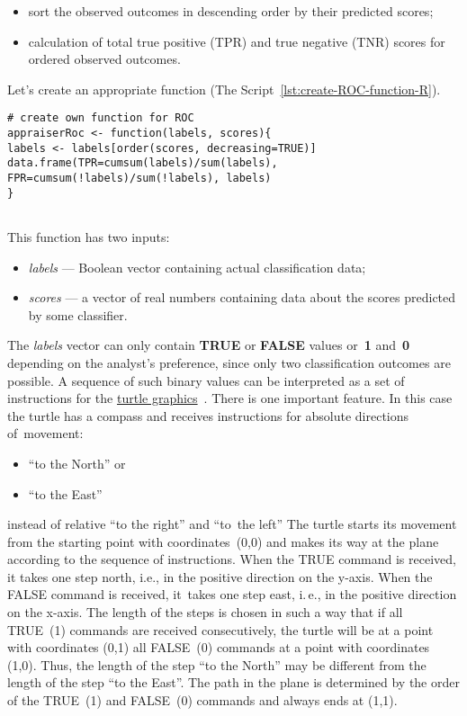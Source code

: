 \documentclass[]{scrreprt}
\begin{document}
\begin{itemize}
	\item sort the observed outcomes in descending order by their predicted scores;
	\item calculation of total true positive (TPR) and true negative (TNR) scores for ordered observed outcomes.
\end{itemize}
Let's create an appropriate function (The Script~\ref{lst:create-ROC-function-R}).
%
\begin{lstlisting}[float=htp, caption = Creating a~function to~calculate TPR and FPR, firstnumber=1, label= lst:create-ROC-function-R]
# create own function for ROC
appraiserRoc <- function(labels, scores){
labels <- labels[order(scores, decreasing=TRUE)]
data.frame(TPR=cumsum(labels)/sum(labels),
FPR=cumsum(!labels)/sum(!labels), labels)
}
 
\end{lstlisting}
%
This function has two inputs:
\begin{itemize}
	\item \emph{labels} --- Boolean vector containing actual classification data;
	\item \emph{scores} --- a vector of real numbers containing data about the scores predicted by some classifier.
\end{itemize}
%
The \emph{labels} vector can only contain \textbf{TRUE} or \textbf{FALSE} values or~\textbf{1} and~\textbf{0} depending on the analyst's preference, since only two classification outcomes are possible. A sequence of such binary values can be interpreted as a set of instructions for the \href{https://en.wikipedia.org/wiki/Turtle_graphics}{turtle graphics}~\cite{Wiki:turtle-graphics}. There is one important feature. In this case the turtle has a compass and receives instructions for absolute directions of~movement:
\begin{itemize}
	\item ``to the North'' or
	\item ``to the East''
\end{itemize}
instead of relative ``to the right'' and ``to~the left'' The turtle starts its movement from the starting point with coordinates~(0,0) and makes its way at the plane according to the sequence of instructions. When the TRUE command is received, it takes one step north, i.e., in the positive direction on the y-axis. When the FALSE command is received, it~takes one step east, i.\,e., in the positive direction on the x-axis. The length of the steps is chosen in such a way that if all TRUE~(1) commands are received consecutively, the turtle will be at a point with coordinates (0,1) all FALSE~(0) commands at a point with coordinates (1,0). Thus, the length of the step ``to the North'' may be different from the length of the step ``to the East''. The path in the plane is determined by the order of the TRUE~(1) and FALSE~(0) commands and always ends at (1,1).
\end{document}
